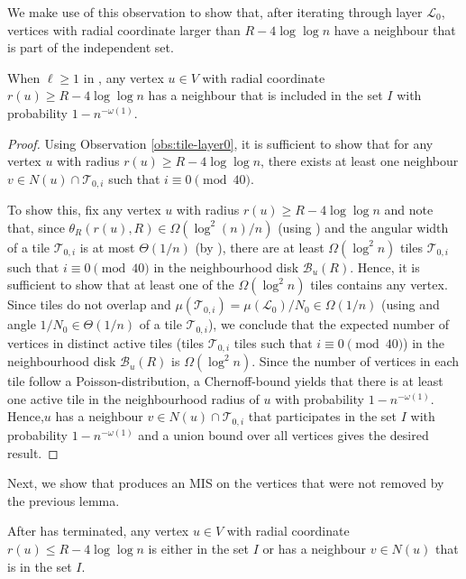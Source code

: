 \documentclass[letterpaper,11pt]{article}
\newcommand{\B}{\mathcal B}
\newcommand{\1}{\mathbb I}
\newcommand{\Layer}[1]{\mathcal{L}_{#1}}
\newcommand{\tiletile}[2]{\mathcal{T}_{#1,#2}}
\begin{document}
We make use of this observation to show that, after iterating through layer $\Layer{0}$, vertices with radial coordinate larger than $R - 4\log\log n$ have a neighbour that is part of the independent set.
%
\begin{lemma}\label{lem:onion-mis-1}
    When $\ell \geq 1$ in \algomis, any vertex $u \in V$ with radial coordinate $r(u) \geq R - 4\log\log n$ has a neighbour that is included in the set $I$ with probability $1 - n^{-\omega(1)}$. 
\end{lemma}
%
\begin{proof}
Using Observation \ref{obs:tile-layer0}, it is sufficient to show that for any vertex $u$ with radius $r(u) \geq R - 4\log\log n$, there exists at least one neighbour $v \in N(u) \cap \tiletile{0}{i}$ such that $i \equiv 0 \pmod{40}$.

To show this, fix any vertex $u$ with radius $r(u) \geq R - 4\log\log n$ and note that, since $\theta_R(r(u), R) \in \Omega(\log^2(n)/n)$ (using ) and the angular width of a tile $\tiletile{0}{i}$ is at most $\Theta(1/n)$ (by ), there are at least $\Omega(\log^2 n)$ tiles $\tiletile{0}{i}$ such that $i \equiv 0 \pmod{40}$ in the neighbourhood disk $\B_u(R)$. Hence, it is sufficient to show that at least one of the $\Omega(\log^2 n)$ tiles contains any vertex. Since tiles do not overlap and $\mu(\tiletile{0}{i}) = \mu(\Layer{0})/{N_0} \in \Omega(1/n)$ (using  and angle $1/N_0 \in \Theta(1/n)$ of a tile $\tiletile{0}{i}$), we conclude that the expected number of vertices in distinct active tiles (tiles $\tiletile{0}{i}$ tiles such that $i \equiv 0 \pmod{40}$) in the neighbourhood disk $\B_u(R)$ is $\Omega(\log^2 n)$. Since the number of vertices in each tile follow a Poisson-distribution, a Chernoff-bound yields that there is at least one active tile in the neighbourhood radius of $u$ with probability $1 - n^{-\omega(1)}$. Hence,$u$ has a neighbour $v \in N(u) \cap \tiletile{0}{i}$ that participates in the set $I$ with probability $1 - n^{-\omega(1)}$ and a union bound over all vertices gives the desired result. 
\end{proof}
%
Next, we show that \algomis produces an MIS on the vertices that were not removed by the previous lemma. 
%
\begin{lemma}\label{lem:onion-mis-2}
   After \algomis has terminated, any vertex $u \in V$ with radial coordinate $r(u) \leq R - 4\log\log n$ is either in the set $I$ or has a neighbour $v \in N(u)$ that is in the set $I$.
\end{lemma}
\end{document}
